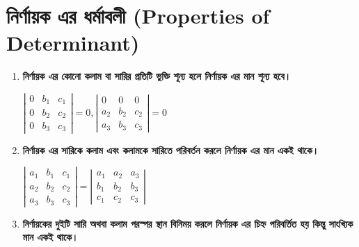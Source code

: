 \section{নির্ণায়ক এর ধর্মাবলী (Properties of Determinant)}\label{section-8} 
\begin{enumerate}
	\item \textbf{নির্ণায়ক এর কোনো কলাম বা সারির প্রতিটি ভুক্তি শূন্য হলে নির্ণায়ক এর মান শূন্য হবে।}\label{prop-1}

	$\left|\begin{array}{ccc}
	0 & b_1 & c_1 \\
	0 & b_2 & c_2 \\
	0 & b_3 & c_3
	\end{array}\right|=0, 
	\left|\begin{array}{ccc}
	0 & 0 & 0 \\
	a_2 & b_2 & c_2 \\
	a_3 & b_3 & c_3
	\end{array}\right|=0$

	\item \textbf{নির্ণায়ক এর সারিকে কলাম এবং কলামকে সারিতে পরিবর্তন করলে নির্ণায়ক এর মান একই থাকে।}\label{prop-2}

	$\left|\begin{array}{ccc}
		a_1 & b_1 & c_1 \\
		a_2 & b_2 & c_2 \\
		a_3 & b_3 & c_3
	\end{array}\right|=\left|\begin{array}{ccc}
	a_1 & a_2 & a_3 \\
	b_1 & b_2 & b_3 \\
	c_1 & c_2 & c_3
	\end{array}\right|$
	

	\item \textbf{নির্ণায়কের দুইটি সারি অথবা কলাম পরস্পর স্থান বিনিময় করলে নির্ণায়ক এর চিহ্ন পরিবর্তিত হয় কিন্তু সাংখ্যিক মান একই থাকে।}\label{prop-3}


\end{enumerate}
